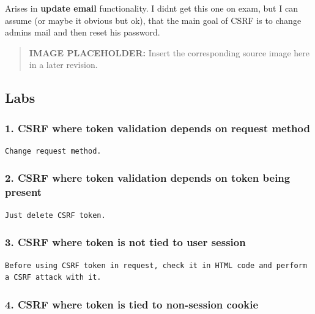 \documentclass[
  letterpaper,
]{article}
\begin{document}
Arises in \textbf{update email} functionality. I didn\textquotesingle t
get this one on exam, but I can assume (or maybe it\textquotesingle{}
obvious but ok), that the main goal of CSRF is to change
admin\textquotesingle s mail and then reset his password.\\
\begin{quote}
\textbf{IMAGE PLACEHOLDER:} Insert the corresponding source image here in a later revision.
\end{quote}
\subsection{Labs}\label{labs-2}

\subsubsection{1. CSRF where token validation depends on request
method}\label{1-csrf-where-token-validation-depends-on-request-method}

\begin{Verbatim}[breaklines,breakanywhere,fontsize=\small]
Change request method.
\end{Verbatim}

\subsubsection{2. CSRF where token validation depends on token being
present}\label{2-csrf-where-token-validation-depends-on-token-being-present}

\begin{Verbatim}[breaklines,breakanywhere,fontsize=\small]
Just delete CSRF token.
\end{Verbatim}

\subsubsection{3. CSRF where token is not tied to user
session}\label{3-csrf-where-token-is-not-tied-to-user-session}

\begin{Verbatim}[breaklines,breakanywhere,fontsize=\small]
Before using CSRF token in request, check it in HTML code and perform a CSRF attack with it.
\end{Verbatim}

\subsubsection{4. CSRF where token is tied to non-session
cookie}\label{4-csrf-where-token-is-tied-to-non-session-cookie}
\end{document}
